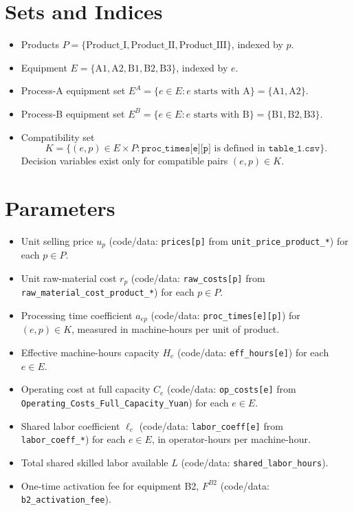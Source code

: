 \section*{Sets and Indices}

\begin{itemize}
    \item Products $P=\{\text{Product\_I},\text{Product\_II},\text{Product\_III}\}$, indexed by $p$.
    \item Equipment $E=\{\text{A1},\text{A2},\text{B1},\text{B2},\text{B3}\}$, indexed by $e$.
    \item Process-A equipment set $E^A=\{e\in E: e \text{ starts with A}\}=\{\text{A1},\text{A2}\}$.
    \item Process-B equipment set $E^B=\{e\in E: e \text{ starts with B}\}=\{\text{B1},\text{B2},\text{B3}\}$.
    \item Compatibility set
    \[
    K=\{(e,p)\in E\times P : \texttt{proc\_times[e][p]} \text{ is defined in } \texttt{table\_1.csv}\}.
    \]
    Decision variables exist only for compatible pairs $(e,p)\in K$.
\end{itemize}

\section*{Parameters}

\begin{itemize}
    \item Unit selling price $u_p$ (code/data: \texttt{prices[p]} from \texttt{unit\_price\_product\_*}) for each $p\in P$.
    \item Unit raw-material cost $r_p$ (code/data: \texttt{raw\_costs[p]} from \texttt{raw\_material\_cost\_product\_*}) for each $p\in P$.
    \item Processing time coefficient $a_{ep}$ (code/data: \texttt{proc\_times[e][p]}) for $(e,p)\in K$, measured in machine-hours per unit of product.
    \item Effective machine-hours capacity $H_e$ (code/data: \texttt{eff\_hours[e]}) for each $e\in E$.
    \item Operating cost at full capacity $C_e$ (code/data: \texttt{op\_costs[e]} from \texttt{Operating\_Costs\_Full\_Capacity\_Yuan}) for each $e\in E$.
    \item Shared labor coefficient $\ell_e$ (code/data: \texttt{labor\_coeff[e]} from \texttt{labor\_coeff\_*}) for each $e\in E$, in operator-hours per machine-hour.
    \item Total shared skilled labor available $L$ (code/data: \texttt{shared\_labor\_hours}).
    \item One-time activation fee for equipment B2, $F^{B2}$ (code/data: \texttt{b2\_activation\_fee}).
\end{itemize}


